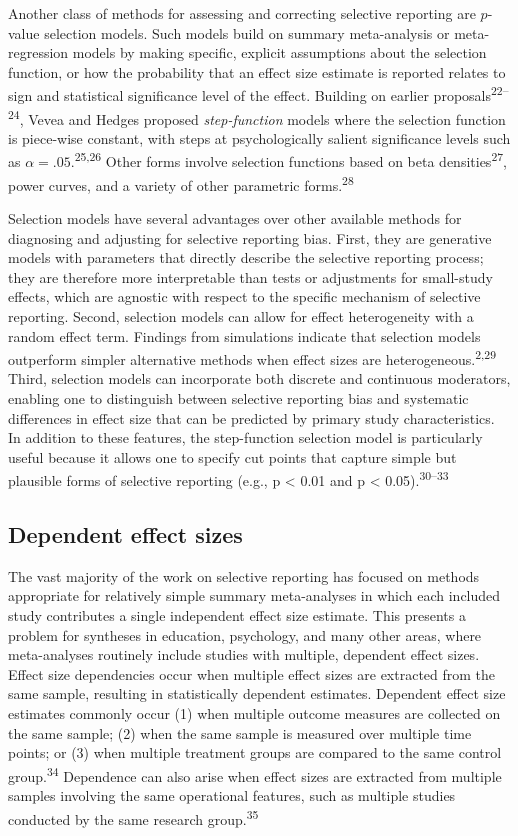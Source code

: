 \documentclass[
  man, donotrepeattitle,floatsintext]{apa7}
\begin{document}
Another class of methods for assessing and correcting selective reporting are \(p\)-value selection models.
Such models build on summary meta-analysis or meta-regression models by making specific, explicit assumptions about the selection function, or how the probability that an effect size estimate is reported relates to sign and statistical significance level of the effect. Building on earlier proposals\textsuperscript{22--24}, Vevea and Hedges proposed \emph{step-function} models where the selection function is piece-wise constant, with steps at psychologically salient significance levels such as \(\alpha = .05\).\textsuperscript{25,26}
Other forms involve selection functions based on beta densities\textsuperscript{27}, power curves, and a variety of other parametric forms.\textsuperscript{28}

Selection models have several advantages over other available methods for diagnosing and adjusting for selective reporting bias.
First, they are generative models with parameters that directly describe the selective reporting process; they are therefore more interpretable than tests or adjustments for small-study effects, which are agnostic with respect to the specific mechanism of selective reporting.
Second, selection models can allow for effect heterogeneity with a random effect term.
Findings from simulations indicate that selection models outperform simpler alternative methods when effect sizes are heterogeneous.\textsuperscript{2,29}
Third, selection models can incorporate both discrete and continuous moderators, enabling one to distinguish between selective reporting bias and systematic differences in effect size that can be predicted by primary study characteristics.
In addition to these features, the step-function selection model is particularly useful because it allows one to specify cut points that capture simple but plausible forms of selective reporting (e.g., p \textless{} 0.01 and p \textless{} 0.05).\textsuperscript{30--33}

\subsection{Dependent effect sizes}\label{dependent-effect-sizes}

The vast majority of the work on selective reporting has focused on methods appropriate for relatively simple summary meta-analyses in which each included study contributes a single independent effect size estimate.
This presents a problem for syntheses in education, psychology, and many other areas, where meta-analyses routinely include studies with multiple, dependent effect sizes.
Effect size dependencies occur when multiple effect sizes are extracted from the same sample, resulting in statistically dependent estimates.
Dependent effect size estimates commonly occur (1) when multiple outcome measures are collected on the same sample; (2) when the same sample is measured over multiple time points; or (3) when multiple treatment groups are compared to the same control group.\textsuperscript{34}
Dependence can also arise when effect sizes are extracted from multiple samples involving the same operational features, such as multiple studies conducted by the same research group.\textsuperscript{35}
\end{document}
